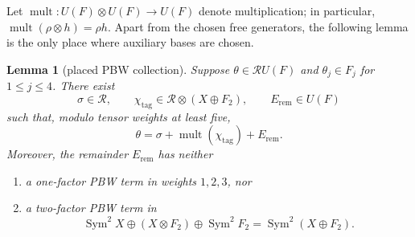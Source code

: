 \documentclass[11pt]{amsart}
\newtheorem{lemma}[theorem]{Lemma}
\newcommand{\Sym}{\operatorname{Sym}}
\newcommand{\Rel}{\mathcal R}
\begin{document}
Let $\operatorname{mult}:U(F)\otimes U(F)\to U(F)$ denote
multiplication; in particular,
$\operatorname{mult}(\rho\otimes h)=\rho h$.  Apart from the chosen
free generators, the following lemma is the only place where
auxiliary bases are chosen.

\begin{lemma}[placed PBW collection]\label{lem:placed}
Suppose $\theta\in\Rel U(F)$ and $\theta_j\in F_j$ for
$1\leq j\leq4$.  There exist
\[
 \sigma\in\Rel,
 \qquad \chi_{\mathrm{tag}}\in\Rel\otimes(X\oplus F_2),
 \qquad E_{\mathrm{rem}}\in U(F)
\]
such that, modulo tensor weights at least five,
\begin{equation}\label{eq:placed-decomposition}
 \theta=\sigma+\operatorname{mult}(\chi_{\mathrm{tag}})+E_{\mathrm{rem}}.
\end{equation}
Moreover, the remainder $E_{\mathrm{rem}}$ has neither
\begin{enumerate}
 \item a one-factor PBW term in weights $1,2,3$, nor
 \item a two-factor PBW term in
 \begin{equation}\label{eq:low-block}
 \Sym^2X\oplus(X\otimes F_2)\oplus\Sym^2F_2
       =\Sym^2(X\oplus F_2).
 \end{equation}
\end{enumerate}
\end{lemma}
\end{document}

